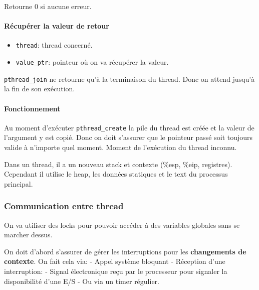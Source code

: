 Retourne \(0\) si aucune erreur.

\paragraph{Récupérer la valeur de
retour}\label{ruxe9cupuxe9rer-la-valeur-de-retour}

\begin{Shaded}
\begin{Highlighting}[]

\OperatorTok{(}\OperatorTok{,}  \OperatorTok{**}\OperatorTok{);}
\end{Highlighting}
\end{Shaded}

\begin{itemize}
\tightlist
\item
  \texttt{thread}: thread concerné.
\item
  \texttt{value\_ptr}: pointeur où on va récupérer la valeur.
\end{itemize}

\texttt{pthread\_join} ne retourne qu'à la terminaison du thread. Donc
on attend jusqu'à la fin de son exécution.

\paragraph{Fonctionnement}\label{fonctionnement}

Au moment d'exécuter \texttt{pthread\_create} la pile du thread est
créée et la valeur de l'argument y est copié. Donc on doit s'assurer que
le pointeur passé soit toujours valide à n'importe quel moment. Moment
de l'exécution du thread inconnu.

Dans un thread, il a un nouveau stack et contexte (\%esp, \%eip,
registres). Cependant il utilise le heap, les données statiques et le
text du processus principal.

\subsubsection{Communication entre
thread}\label{communication-entre-thread}

On va utiliser des locks pour pouvoir accéder à des variables globales
sans se marcher dessus.

On doit d'abord s'assurer de gérer les interruptions pour les
\textbf{changements de contexte}. On fait cela via: - Appel système
bloquant - Réception d'une interruption: - Signal électronique reçu par
le processeur pour signaler la disponibilité d'une E/S - Ou via un timer
régulier.


